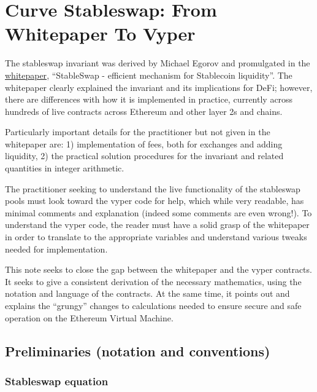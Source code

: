 \documentclass[
]{article}
\date{}
\begin{document}
\hypertarget{curve-stableswap-from-whitepaper-to-vyper}{%
\section{Curve Stableswap: From Whitepaper To
Vyper}\label{curve-stableswap-from-whitepaper-to-vyper}}

The stableswap invariant was derived by Michael Egorov and promulgated
in the \href{https://curve.fi/files/stableswap-paper.pdf}{whitepaper},
``StableSwap - efficient mechanism for Stablecoin liquidity''. The
whitepaper clearly explained the invariant and its implications for
DeFi; however, there are differences with how it is implemented in
practice, currently across hundreds of live contracts across Ethereum
and other layer 2s and chains.

Particularly important details for the practitioner but not given in the
whitepaper are: 1) implementation of fees, both for exchanges and adding
liquidity, 2) the practical solution procedures for the invariant and
related quantities in integer arithmetic.

The practitioner seeking to understand the live functionality of the
stableswap pools must look toward the vyper code for help, which while
very readable, has minimal comments and explanation (indeed some
comments are even wrong!). To understand the vyper code, the reader must
have a solid grasp of the whitepaper in order to translate to the
appropriate variables and understand various tweaks needed for
implementation.

This note seeks to close the gap between the whitepaper and the vyper
contracts. It seeks to give a consistent derivation of the necessary
mathematics, using the notation and language of the contracts. At the
same time, it points out and explains the ``grungy'' changes to
calculations needed to ensure secure and safe operation on the Ethereum
Virtual Machine.

\hypertarget{preliminaries-notation-and-conventions}{%
\subsection{Preliminaries (notation and
conventions)}\label{preliminaries-notation-and-conventions}}

\hypertarget{stableswap-equation}{%
\subsubsection{Stableswap equation}\label{stableswap-equation}}
\end{document}
